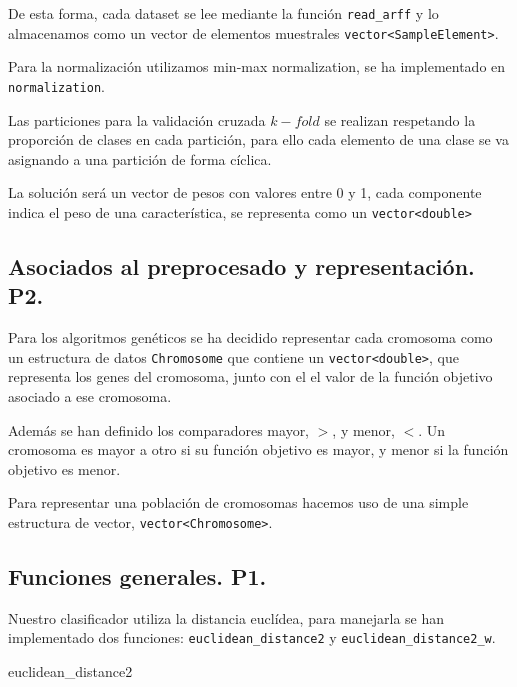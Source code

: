 \documentclass[11pt,a4paper]{article}
\theoremstyle{definition}
\begin{document}
	De esta forma, cada dataset se lee mediante la función \texttt{read\_arff} y lo almacenamos como un vector de elementos muestrales \texttt{vector<SampleElement>}. 
	
	Para la normalización utilizamos min-max normalization, se ha implementado en \texttt{normalization}.
	
	Las particiones para la validación cruzada $k-fold$ se realizan respetando la proporción de clases en cada partición, para ello cada elemento de una clase se va asignando a una partición de forma cíclica.
	
	La solución será un vector de pesos con valores entre 0 y 1, cada componente indica el peso de una característica, se representa como un \texttt{vector<double>}
	\subsection{Asociados al preprocesado y representación. P2.}
	Para los algoritmos genéticos se ha decidido representar cada cromosoma como un estructura de datos \texttt{Chromosome} que contiene un \texttt{vector<double>}, que representa los genes del cromosoma, junto con el el valor de la función objetivo asociado a ese cromosoma.
	
	Además se han definido los comparadores mayor, $>$, y menor, $<$. Un cromosoma es mayor a otro si su función objetivo es mayor, y menor si la función objetivo es menor.
	
	Para representar una población de cromosomas hacemos uso de una simple estructura de vector, \texttt{vector<Chromosome>}.
	\subsection{Funciones generales. P1.}
	Nuestro clasificador utiliza la distancia euclídea, para manejarla se han implementado dos funciones: \texttt{euclidean\_distance2} y \texttt{euclidean\_distance2\_w}.\\
	
	
	\begin{algorithm}[H]
		\caption{euclidean\_distance2}
	\end{algorithm}~\\
	
\end{document}
